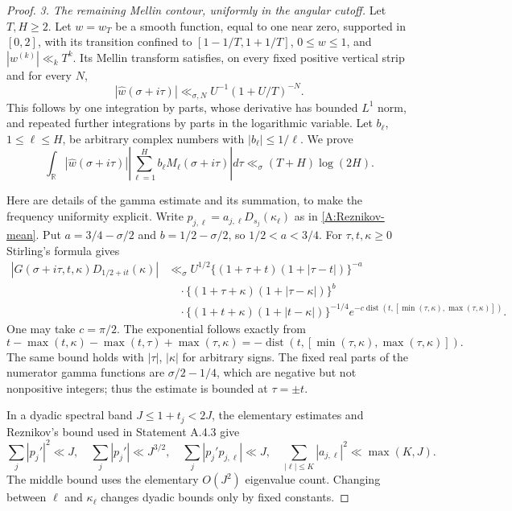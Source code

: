 \begin{proof}
\emph{3. The remaining Mellin contour, uniformly in the angular cutoff.}
Let $T,H\geq2$. Let $w=w_T$ be a smooth function, equal to one
near zero, supported in $[0,2]$, with its transition confined to
$[1-1/T,1+1/T]$, $0\leq w\leq1$, and
$|w^{(k)}|\ll_kT^k$. Its Mellin transform satisfies, on every
fixed positive vertical strip and for every $N$,
\begin{equation}\label{A:w-Mellin-bound}
 |\widehat w(\sigma+i\tau)|
 \ll_{\sigma,N}U^{-1}(1+U/T)^{-N}.
\end{equation}
This follows by one integration by parts, whose derivative has
bounded $L^1$ norm, and repeated further integrations by parts in
the logarithmic variable. Let $b_\ell$, $1\leq\ell\leq H$, be
arbitrary complex numbers with $|b_\ell|\leq1/\ell$.
We prove
\begin{equation}\label{A:contour-uniform}
 \int_{\mathbb R}|\widehat w(\sigma+i\tau)|
 \left|\sum_{\ell=1}^H b_\ell M_\ell(\sigma+i\tau)\right|d\tau
       \ll_\sigma (T+H)\log(2H).
\end{equation}

Here are details of the gamma estimate and its summation, to make
the frequency uniformity explicit. Write
$p_{j,\ell}=a_{j,\ell}D_{s_j}(\kappa_\ell)$ as in
\eqref{A:Reznikov-mean}. Put
$a=3/4-\sigma/2$ and $b=1/2-\sigma/2$, so $1/2<a<3/4$.
For $\tau,t,\kappa\geq0$ Stirling's formula gives
\begin{align}\label{A:gamma-full-bound}
 |G(\sigma+i\tau,t,\kappa)D_{1/2+it}(\kappa)|
 &\ll_\sigma U^{1/2}
  \{(1+\tau+t)(1+|\tau-t|)\}^{-a}\\
 &\quad\cdot\{(1+\tau+\kappa)(1+|\tau-\kappa|)\}^{b}
 \\ &\quad\cdot\{(1+t+\kappa)(1+|t-\kappa|)\}^{-1/4}
 e^{-c\operatorname{dist}(t,[\min(\tau,\kappa),\max(\tau,\kappa)])}.
 \nonumber
\end{align}
One may take $c=\pi/2$. The exponential follows exactly from
\[
 t-\max(t,\kappa)-\max(t,\tau)+\max(\tau,\kappa)
 =-\operatorname{dist}(t,[\min(\tau,\kappa),\max(\tau,\kappa)]).
\]
The same bound holds with $|\tau|$, $|\kappa|$ for arbitrary signs.
The fixed real parts of the numerator gamma functions are
$\sigma/2-1/4$, which are negative but not nonpositive integers;
thus the estimate is bounded at $\tau=\pm t$.

In a dyadic spectral band $J\leq1+t_j<2J$, the elementary
estimates and Reznikov's bound used in Statement A.4.3 give
\begin{equation}\label{A:three-basic-sums}
 \sum_j|p_j'|^2\ll J,\quad
 \sum_j|p_j'|\ll J^{3/2},\quad
 \sum_j|p_j'p_{j,\ell}|\ll J,
 \quad\sum_{|\ell|\leq K}|a_{j,\ell}|^2\ll\max(K,J).
\end{equation}
The middle bound uses the elementary $O(J^2)$ eigenvalue count.
Changing between $\ell$ and $\kappa_\ell$ changes dyadic bounds
only by fixed constants.


\end{proof}
